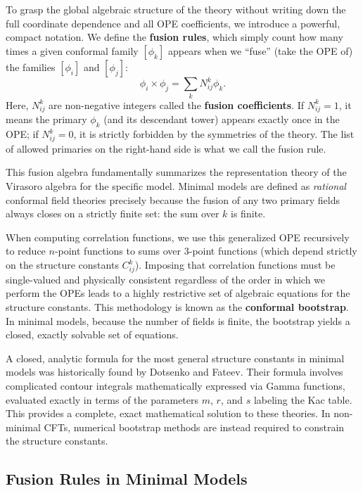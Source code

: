 To grasp the global algebraic structure of the theory without writing down the full coordinate dependence and all OPE coefficients, we introduce a powerful, compact notation. We define the \textbf{fusion rules}, which simply count how many times a given conformal family \([\phi_k]\) appears when we ``fuse'' (take the OPE of) the families \([\phi_i]\) and \([\phi_j]\):
\[
    \phi_i \times \phi_j = \sum_k N_{ij}^k \phi_k.
\]
Here, \(N_{ij}^k\) are non-negative integers called the \textbf{fusion coefficients}. If \(N_{ij}^k = 1\), it means the primary \(\phi_k\) (and its descendant tower) appears exactly once in the OPE; if \(N_{ij}^k = 0\), it is strictly forbidden by the symmetries of the theory. The list of allowed primaries on the right-hand side is what we call the fusion rule.

This fusion algebra fundamentally summarizes the representation theory of the Virasoro algebra for the specific model. Minimal models are defined as \textit{rational} conformal field theories precisely because the fusion of any two primary fields always closes on a strictly finite set: the sum over \(k\) is finite.

When computing correlation functions, we use this generalized OPE recursively to reduce \(n\)-point functions to sums over \(3\)-point functions (which depend strictly on the structure constants \(C_{ij}^k\)). Imposing that correlation functions must be single-valued and physically consistent regardless of the order in which we perform the OPEs leads to a highly restrictive set of algebraic equations for the structure constants. This methodology is known as the \textbf{conformal bootstrap}. In minimal models, because the number of fields is finite, the bootstrap yields a closed, exactly solvable set of equations.

\begin{remark}
    A closed, analytic formula for the most general structure constants in minimal models was historically found by Dotsenko and Fateev. Their formula involves complicated contour integrals mathematically expressed via Gamma functions, evaluated exactly in terms of the parameters \(m\), \(r\), and \(s\) labeling the Kac table. This provides a complete, exact mathematical solution to these theories. In non-minimal CFTs, numerical bootstrap methods are instead required to constrain the structure constants.
\end{remark}

\subsection{Fusion Rules in Minimal Models}

